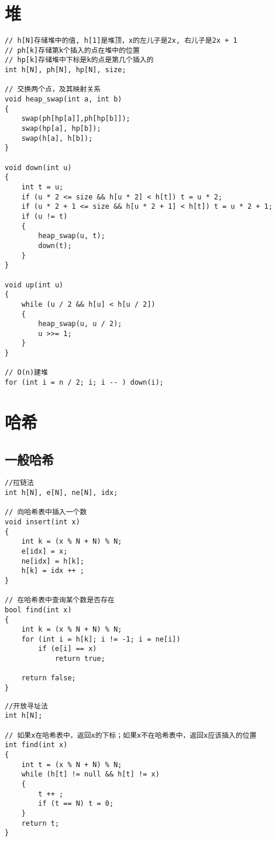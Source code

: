 \documentclass[12pt,a4paper,UTF16]{ctexbook}
\theoremstyle{plain}
\begin{document}
\section{堆}
\begin{lstlisting}
// h[N]存储堆中的值, h[1]是堆顶，x的左儿子是2x, 右儿子是2x + 1
// ph[k]存储第k个插入的点在堆中的位置
// hp[k]存储堆中下标是k的点是第几个插入的
int h[N], ph[N], hp[N], size;

// 交换两个点，及其映射关系
void heap_swap(int a, int b)
{
    swap(ph[hp[a]],ph[hp[b]]);
    swap(hp[a], hp[b]);
    swap(h[a], h[b]);
}

void down(int u)
{
    int t = u;
    if (u * 2 <= size && h[u * 2] < h[t]) t = u * 2;
    if (u * 2 + 1 <= size && h[u * 2 + 1] < h[t]) t = u * 2 + 1;
    if (u != t)
    {
        heap_swap(u, t);
        down(t);
    }
}

void up(int u)
{
    while (u / 2 && h[u] < h[u / 2])
    {
        heap_swap(u, u / 2);
        u >>= 1;
    }
}

// O(n)建堆
for (int i = n / 2; i; i -- ) down(i);
\end{lstlisting}

\section{哈希}
\subsection{一般哈希}
\begin{lstlisting}
//拉链法
int h[N], e[N], ne[N], idx;

// 向哈希表中插入一个数
void insert(int x)
{
    int k = (x % N + N) % N;
    e[idx] = x;
    ne[idx] = h[k];
    h[k] = idx ++ ;
}

// 在哈希表中查询某个数是否存在
bool find(int x)
{
    int k = (x % N + N) % N;
    for (int i = h[k]; i != -1; i = ne[i])
        if (e[i] == x)
            return true;

    return false;
}
\end{lstlisting}
\begin{lstlisting}
//开放寻址法
int h[N];

// 如果x在哈希表中，返回x的下标；如果x不在哈希表中，返回x应该插入的位置
int find(int x)
{
    int t = (x % N + N) % N;
    while (h[t] != null && h[t] != x)
    {
        t ++ ;
        if (t == N) t = 0;
    }
    return t;
}
\end{lstlisting}
\end{document}
